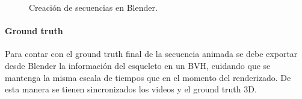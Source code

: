 \begin{figure}[H]
   \caption{Creación de secuencias en Blender.}   
 \end{figure} 


 
\paragraph{Ground truth} 

Para contar con el ground truth final de la secuencia animada se debe exportar desde Blender la información del esqueleto en un BVH, cuidando que se mantenga la misma escala de tiempos que en el momento del renderizado. De esta manera se tienen sincronizados los videos y el ground truth 3D.


